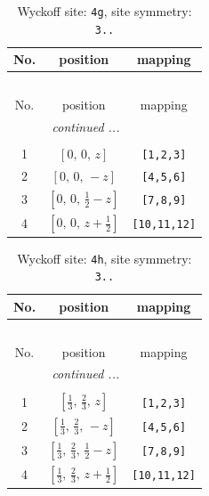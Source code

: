 \documentclass[fleqn,8pt]{jsarticle}
\begin{document}
\begin{longtable}{ccc}
\caption{Wyckoff site: {\tt 4g}, site symmetry: {\tt 3..}}
 \\
 \hline \hline
No. & position & mapping \\ \hline \endfirsthead

\multicolumn{2}{l}{\tablename\ \thetable{}} \\
 \hline \hline
No. & position & mapping \\ \hline \endhead

 \hline \hline
\multicolumn{2}{r}{\footnotesize\it continued ...} \\ \endfoot

 \hline \hline
\multicolumn{2}{r}{} \\ \endlastfoot

1 & $\left[ 0,\, 0,\, z \right]$ & {\tt [1,2,3]} \\ \hline
2 & $\left[ 0,\, 0,\, - z \right]$ & {\tt [4,5,6]} \\ \hline
3 & $\left[ 0,\, 0,\, \frac{1}{2} - z \right]$ & {\tt [7,8,9]} \\ \hline
4 & $\left[ 0,\, 0,\, z + \frac{1}{2} \right]$ & {\tt [10,11,12]} \\
\end{longtable}
\renewcommand{\arraystretch}{1.2}
\begin{longtable}{ccc}
\caption{Wyckoff site: {\tt 4h}, site symmetry: {\tt 3..}}
 \\
 \hline \hline
No. & position & mapping \\ \hline \endfirsthead

\multicolumn{2}{l}{\tablename\ \thetable{}} \\
 \hline \hline
No. & position & mapping \\ \hline \endhead

 \hline \hline
\multicolumn{2}{r}{\footnotesize\it continued ...} \\ \endfoot

 \hline \hline
\multicolumn{2}{r}{} \\ \endlastfoot

1 & $\left[ \frac{1}{3},\, \frac{2}{3},\, z \right]$ & {\tt [1,2,3]} \\ \hline
2 & $\left[ \frac{1}{3},\, \frac{2}{3},\, - z \right]$ & {\tt [4,5,6]} \\ \hline
3 & $\left[ \frac{1}{3},\, \frac{2}{3},\, \frac{1}{2} - z \right]$ & {\tt [7,8,9]} \\ \hline
4 & $\left[ \frac{1}{3},\, \frac{2}{3},\, z + \frac{1}{2} \right]$ & {\tt [10,11,12]} \\
\end{longtable}
\end{document}
